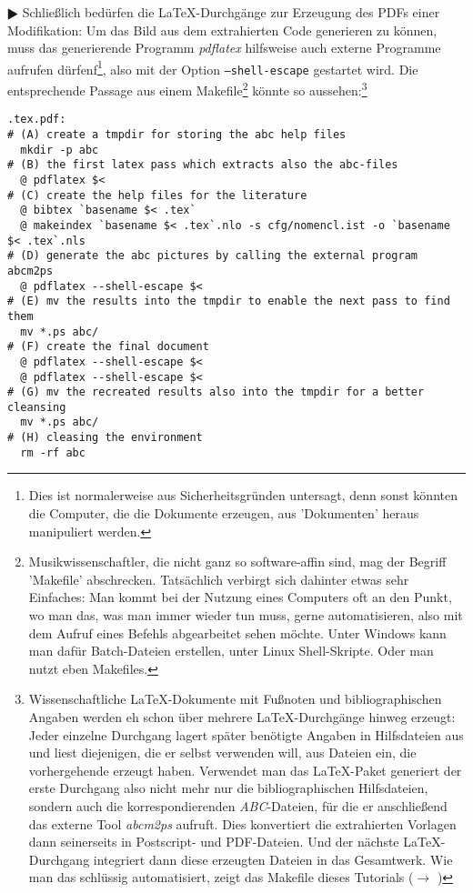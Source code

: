 $\RHD$ Schließlich bedürfen die \LaTeX-Durchgänge zur Erzeugung des PDFs einer
Modifikation: Um das Bild aus dem extrahierten Code generieren zu können, muss
das generierende Programm \textit{pdflatex} hilfsweise auch externe Programme
aufrufen dürfenf\footnote{Dies ist normalerweise aus Sicherheitsgründen
untersagt, denn sonst könnten die Computer, die die Dokumente erzeugen, aus
'Dokumenten' heraus manipuliert werden.}, also mit der Option
\texttt{--shell-escape} gestartet wird. Die entsprechende Passage aus einem
Makefile\footnote{Musikwissenschaftler, die nicht ganz so software-affin sind,
mag der Begriff 'Makefile' abschrecken. Tatsächlich verbirgt sich dahinter etwas
sehr Einfaches: Man kommt bei der Nutzung eines Computers oft an den Punkt, wo
man das, was man immer wieder tun muss, gerne automatisieren, also mit dem
Aufruf eines Befehls abgearbeitet sehen möchte. Unter Windows kann man dafür
Batch-Dateien erstellen, unter Linux Shell-Skripte. Oder man nutzt eben
Makefiles.} könnte so aussehen:\footnote{Wissenschaftliche \LaTeX-Dokumente mit
Fußnoten und bibliographischen Angaben werden eh schon über mehrere
\LaTeX-Durchgänge hinweg erzeugt: Jeder einzelne Durchgang lagert später
benötigte Angaben in Hilfsdateien aus und liest diejenigen, die er selbst
verwenden will, aus Dateien ein, die vorhergehende erzeugt haben. Verwendet man
das \LaTeX-Paket generiert der erste Durchgang also nicht mehr nur die
bibliographischen Hilfsdateien, sondern auch die korrespondierenden
\textit{ABC}-Dateien, für die er anschließend das externe Tool \textit{abcm2ps}
aufruft. Dies konvertiert die extrahierten Vorlagen dann seinerseits in
Postscript- und PDF-Dateien. Und der nächste \LaTeX-Durchgang integriert dann
diese erzeugten Dateien in das Gesamtwerk. Wie man das schlüssig automatisiert,
zeigt das Makefile dieses Tutorials ($\rightarrow$
) } 

\begin{small}
\begin{verbatim}
.tex.pdf:
# (A) create a tmpdir for storing the abc help files
  mkdir -p abc
# (B) the first latex pass which extracts also the abc-files
  @ pdflatex $<
# (C) create the help files for the literature        
  @ bibtex `basename $< .tex`
  @ makeindex `basename $< .tex`.nlo -s cfg/nomencl.ist -o `basename $< .tex`.nls
# (D) generate the abc pictures by calling the external program abcm2ps
  @ pdflatex --shell-escape $<
# (E) mv the results into the tmpdir to enable the next pass to find them
  mv *.ps abc/
# (F) create the final document 
  @ pdflatex --shell-escape $< 
  @ pdflatex --shell-escape $< 
# (G) mv the recreated results also into the tmpdir for a better cleansing
  mv *.ps abc/
# (H) cleasing the environment
  rm -rf abc
\end{verbatim}
\end{small}

